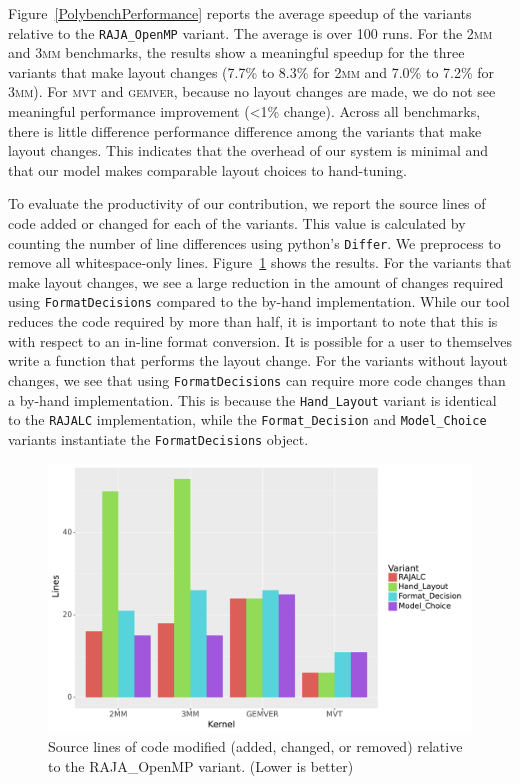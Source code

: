 \documentclass[sigconf,review=true]{acmart}
\begin{document}
Figure~\ref{PolybenchPerformance} reports the average speedup of the variants relative to the \verb.RAJA_OpenMP. variant. 
The average is over 100 runs. 
For the \textsc{2mm} and \textsc{3mm} benchmarks, the results show a meaningful speedup for the three variants that make layout changes (7.7\% to 8.3\% for \textsc{2mm} and 7.0\% to 7.2\% for \textsc{3mm}).
For \textsc{mvt} and \textsc{gemver}, because no layout changes are made, we do not see meaningful performance improvement (<1\% change).
Across all benchmarks, there is little difference performance difference among the variants that make layout changes.
This indicates that the overhead of our system is minimal and that our model makes comparable layout choices to hand-tuning.

To evaluate the productivity of our contribution, we report the source lines of code added or changed for each of the variants.
This value is calculated by counting the number of line differences using python's \verb.Differ.. 
We preprocess to remove all whitespace-only lines.
Figure~\ref{PolybenchSLOC} shows the results.
For the variants that make layout changes, we see a large reduction in the amount of changes required using \verb.FormatDecisions. compared to the by-hand implementation. 
While our tool reduces the code required by more than half, it is important to note that this is with respect to an in-line format conversion.
It is possible for a user to themselves write a function that performs the layout change.
For the variants without layout changes, we see that using \verb.FormatDecisions. can require more code changes than a by-hand implementation. 
This is because the \verb.Hand_Layout. variant is identical to the \verb.RAJALC. implementation, while the \verb.Format_Decision. and \verb.Model_Choice. variants instantiate the \verb.FormatDecisions. object.

\begin{figure}
	\includegraphics[width=\columnwidth]{PolybenchSLOC.pdf}
	\caption{Source lines of code modified (added, changed, or removed) relative to the RAJA\_OpenMP variant. (Lower is better)}
	\label{PolybenchSLOC}  
\end{figure}
\end{document}
